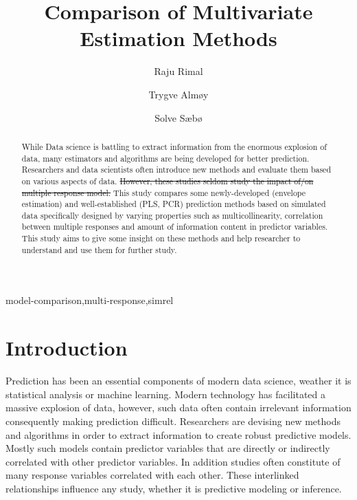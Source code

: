 \documentclass[12pt,3p,authoryear]{elsarticle}
\begin{document}
\begin{frontmatter}

  \title{Comparison of Multivariate Estimation Methods}
  
    \author[KBM]{Raju Rimal}
    \author[KBM]{Trygve Almøy}
  
    \author[NMBU]{Solve Sæbø}
  
      \address[KBM]{Faculty of Chemistry and Bioinformatics, Norwegian University of Life
Sciences, Ås, Norway}
    \address[NMBU]{Prorector, Norwegian University of Life Sciences, Ås, Norway}
  
  \begin{abstract}
  While Data science is battling to extract information from the enormous
  explosion of data, many estimators and algorithms are being developed
  for better prediction. Researchers and data scientists often introduce
  new methods and evaluate them based on various aspects of data.
  \sout{However, these studies seldom study the impact of/on multiple
  response model.} This study compares some newly-developed (envelope
  estimation) and well-established (PLS, PCR) prediction methods based on
  simulated data specifically designed by varying properties such as
  multicollinearity, correlation between multiple responses and amount of
  information content in predictor variables. This study aims to give some
  insight on these methods and help researcher to understand and use them
  for further study.
  \end{abstract}
   \begin{keyword} model-comparison,multi-response,simrel\end{keyword}

\end{frontmatter}

\hypertarget{introduction}{%
\section{Introduction}\label{introduction}}

Prediction has been an essential components of modern data science,
weather it is statistical analysis or machine learning. Modern
technology has facilitated a massive explosion of data, however, such
data often contain irrelevant information consequently making prediction
difficult. Researchers are devising new methods and algorithms in order
to extract information to create robust predictive models. Mostly such
models contain predictor variables that are directly or indirectly
correlated with other predictor variables. In addition studies often
constitute of many response variables correlated with each other. These
interlinked relationships influence any study, whether it is predictive
modeling or inference.
\end{document}
